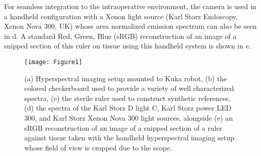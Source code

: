 For seamless integration to the intraoperative environment, the camera is used in a handheld configuration with a Xenon light source (Karl Storz Endoscopy, Xenon Nova 300, UK) whose area normalized emission spectrum can also be seen in d. A standard Red, Green, Blue (sRGB) reconstruction of an image of a snipped section of this ruler on tissue using this handheld system is shown in e.
\begin{figure}[h!]
        \centering
        \texttt{[image: Figure1]}
        \hspace{2mm}
	\caption{(a) Hyperspectral imaging setup mounted to Kuka robot, (b) the colored checkerboard used to provide a variety of well characterized spectra, (c) the sterile ruler used to construct synthetic references, (d) the spectra of the Karl Storz D light C, Karl Storz power LED 300, and Karl Storz Xenon Nova 300 light sources, alongside (e) an sRGB reconstruction of an image of a snipped section of a ruler against tissue taken with the handheld hyperspectral imaging setup whose field of view is cropped due to the scope.}
	\label{fig:setup}
\end{figure}

